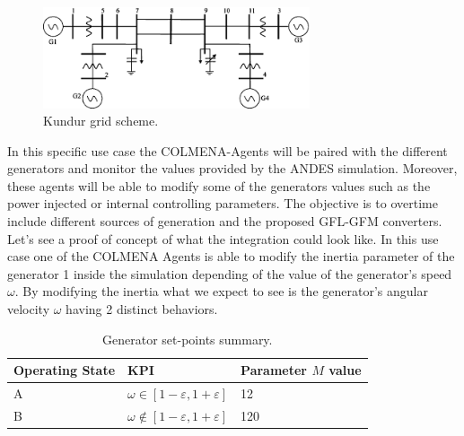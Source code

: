 \documentclass{article}
\begin{document}
\begin{figure}[!htb]
    \centering
    \includegraphics[width=0.7\textwidth]{pictures/kundurgrid.png}
    \caption{Kundur grid scheme. \cite{grids:kundur}}
    \label{fig:kundur2}
\end{figure}

In this specific use case the COLMENA-Agents will be paired with the different generators and monitor the values provided by the ANDES simulation. Moreover, these agents will be able to modify some of the generators values such as the power injected or internal controlling parameters. The objective is to overtime include different sources of generation and the proposed GFL-GFM converters. Let's see a proof of concept of what the integration could look like. In this use case one of the COLMENA Agents is able to modify the inertia parameter of the generator 1 inside the simulation depending of the value of the generator's speed $\omega$. By modifying the inertia what we expect to see is the generator's angular velocity $\omega$ having 2 distinct behaviors.  

\begin{table}[H]
    \centering
    \begin{tabular}{|l|l|l|}
    \hline
    Operating State & KPI                              & Parameter $M$ value \\ \hline
    A               & $\omega \in [1 - \varepsilon, 1 + \varepsilon]$ & 12  \\ \hline
    B               & $\omega \notin [1 - \varepsilon, 1 + \varepsilon]$ & 120               \\ \hline
    \end{tabular}
    \caption{Generator set-points summary.}
\end{table}
  
\end{document}
